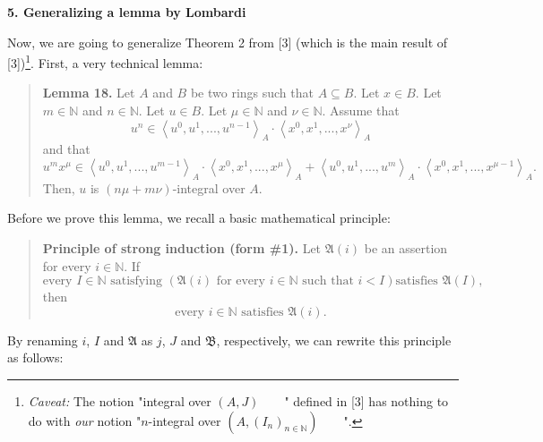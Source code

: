\documentclass[12pt,final,notitlepage,onecolumn]{article}%
\begin{document}
\begin{center}
\color{blue} \textbf{5. Generalizing a lemma by Lombardi} \color{black}
\end{center}

Now, we are going to generalize Theorem 2 from [3] (which is the main result
of [3])\footnote{\textit{Caveat:} The notion "integral over $\left(
A,J\right)  $\ \ \ \ " defined in [3] has nothing to do with \textit{our}
notion "$n$-integral over $\left(  A,\left(  I_{n}\right)  _{n\in\mathbb{N}%
}\right)  $\ \ \ \ ".}. First, a very technical lemma:

\begin{quote}
\textbf{Lemma 18.} Let $A$ and $B$ be two rings such that $A\subseteq B$. Let
$x\in B$. Let $m\in\mathbb{N}$ and $n\in\mathbb{N}$. Let $u\in B$. Let $\mu
\in\mathbb{N}$ and $\nu\in\mathbb{N}$. Assume that%
\begin{equation}
u^{n}\in\left\langle u^{0},u^{1},...,u^{n-1}\right\rangle _{A}\cdot
\left\langle x^{0},x^{1},...,x^{\nu}\right\rangle _{A} \label{L18-1}%
\end{equation}
and that%
\begin{equation}
u^{m}x^{\mu}\in\left\langle u^{0},u^{1},...,u^{m-1}\right\rangle _{A}%
\cdot\left\langle x^{0},x^{1},...,x^{\mu}\right\rangle _{A}+\left\langle
u^{0},u^{1},...,u^{m}\right\rangle _{A}\cdot\left\langle x^{0},x^{1}%
,...,x^{\mu-1}\right\rangle _{A}. \label{L18-2}%
\end{equation}
Then, $u$ is $\left(  n\mu+m\nu\right)  $-integral over $A$.
\end{quote}

Before we prove this lemma, we recall a basic mathematical principle:

\begin{quote}
\textbf{Principle of strong induction (form \#1).} Let $\mathfrak{A}\left(
i\right)  $ be an assertion for every $i\in\mathbb{N}$. If%
\[
\text{every }I\in\mathbb{N}\text{ satisfying }\left(  \mathfrak{A}\left(
i\right)  \text{ for every }i\in\mathbb{N}\text{ such that }i<I\right)  \text{
satisfies }\mathfrak{A}\left(  I\right)  ,
\]
then%
\[
\text{every }i\in\mathbb{N}\text{ satisfies }\mathfrak{A}\left(  i\right)
\text{.}%
\]



\end{quote}

By renaming $i$, $I$ and $\mathfrak{A}$ as $j$, $J$ and $\mathfrak{B}$,
respectively, we can rewrite this principle as follows:
\end{document}
